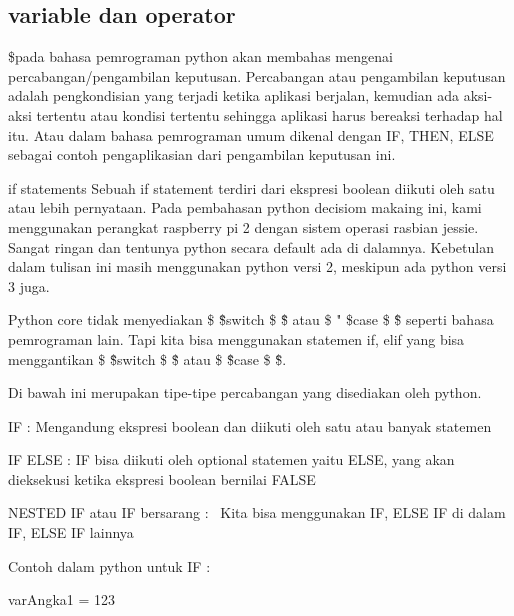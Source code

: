 \subsection{variable dan operator}
\$pada bahasa pemrograman python akan membahas mengenai percabangan/pengambilan keputusan. Percabangan atau pengambilan keputusan adalah pengkondisian yang terjadi ketika aplikasi berjalan, kemudian ada aksi-aksi tertentu atau kondisi tertentu sehingga aplikasi harus bereaksi terhadap hal itu. Atau dalam bahasa pemrograman umum dikenal dengan IF, THEN, ELSE sebagai contoh pengaplikasian dari pengambilan keputusan ini. \par
\vspace{12pt}
if statements
Sebuah if statement terdiri dari ekspresi boolean diikuti oleh satu atau lebih pernyataan.
\noindent 
Pada pembahasan python decisiom makaing ini, kami menggunakan perangkat raspberry pi 2 dengan sistem operasi rasbian jessie. Sangat ringan dan tentunya python secara default ada di dalamnya. Kebetulan dalam tulisan ini masih menggunakan python versi 2, meskipun ada python versi 3 juga. \par
\vspace{12pt}
\noindent 
Python core tidak menyediakan  \$ \" \$switch \$ \" \$ atau  \$ " \$case \$ \" \$ seperti bahasa pemrograman lain. Tapi kita bisa menggunakan statemen if, elif yang bisa menggantikan  \$ \" \$switch \$ \" \$ atau  \$ \" \$case \$ \" \$. \par
\vspace{12pt}
\noindent 
Di bawah ini merupakan tipe-tipe percabangan yang disediakan oleh python. \par
\vspace{12pt}
\noindent 
IF : Mengandung ekspresi boolean dan diikuti oleh satu atau banyak statemen \par
\vspace{12pt}
\noindent 
IF ELSE : IF bisa diikuti oleh optional statemen yaitu ELSE, yang akan dieksekusi ketika ekspresi boolean bernilai FALSE \par
\vspace{12pt}
\noindent 
NESTED IF atau IF bersarang :~ Kita bisa menggunakan IF, ELSE IF di dalam IF, ELSE IF lainnya \par
\vspace{12pt}
\noindent 
Contoh dalam python untuk IF :  \par
\vspace{12pt}
\noindent 
varAngka1 = 123 \par
\vspace{12pt}
